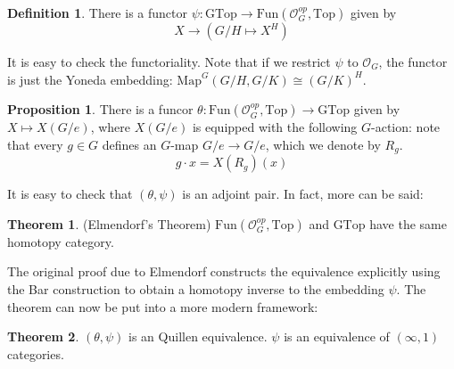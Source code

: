 \documentclass{article}
\theoremstyle{definition}
\newtheorem{theorem}{Theorem}[section]
\theoremstyle{definition}
\newtheorem{definition}{Definition}[theorem]
\theoremstyle{definition}
\theoremstyle{definition}
\newtheorem{proposition}{Proposition}[theorem]
\theoremstyle{definition}
\theoremstyle{definition}
\theoremstyle{definition}
\begin{document}
    
    
    \begin{tcolorbox}[colback=purple!5!white,colframe=purple!75!black]
    \begin{definition}
    There is a functor $\psi: \textrm{GTop}\to \textrm{Fun}(\mathcal{O}^{op}_G,\textrm{Top})$ given by 
    \[X\to (G/H\mapsto X^H)\]
    \end{definition}
    \end{tcolorbox}
    It is easy to check the functoriality. Note that if we restrict $\psi$ to $\mathcal{O}_G$, the functor is just the Yoneda embedding: $\textrm{Map}^G(G/H,G/K)\cong (G/K)^H$.
    
    \begin{tcolorbox}[colback=blue!5!white,colframe=blue!30!white]
        \begin{proposition}
        There is a funcor $\theta: \textrm{Fun}(\mathcal{O}^{op}_G,\textrm{Top})\to \textrm{GTop}$ given by $X\mapsto X(G/e)$, where $X(G/e)$ is equipped with the following $G$-action: note that every $g\in G$ defines an $G$-map $G/e\to G/e$, which we denote by $R_g$.
        \[g\cdot x=X(R_g)(x)\] 
        \end{proposition}
        \end{tcolorbox}
        
        It is easy to check that $(\theta,\psi)$ is an adjoint pair. In fact, more can be said:
        
        \begin{tcolorbox}[colback=red!5!white,colframe=red!30!white]
            \begin{theorem}
            (Elmendorf's Theorem) $\textrm{Fun}(\mathcal{O}^{op}_G,\textrm{Top})$ and $\textrm{GTop}$ have the same homotopy category. 
            \end{theorem}
            \end{tcolorbox}
        The original proof due to Elmendorf constructs the equivalence explicitly using the Bar construction to obtain a homotopy inverse to the embedding $\psi$. The theorem can now be put into a more modern framework:
    
        \begin{tcolorbox}[colback=red!5!white,colframe=red!30!white]
        \begin{theorem}
        $(\theta,\psi)$ is an Quillen equivalence. $\psi$ is an equivalence of $(\infty,1)$ categories. 
        \end{theorem}
        \end{tcolorbox}
    
\end{document}
